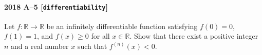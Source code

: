 \paragraph{2018 A--5 \textnormal{[\texttt{differentiability}]}}
Let $f: \mathbb{R} \to \mathbb{R}$ be an infinitely differentiable function satisfying $f(0) = 0$, $f(1)= 1$,
and $f(x) \geq 0$ for all $x \in \mathbb{R}$. Show that there exist a positive integer $n$ and a real number $x$
such that $f^{(n)}(x) < 0$.
